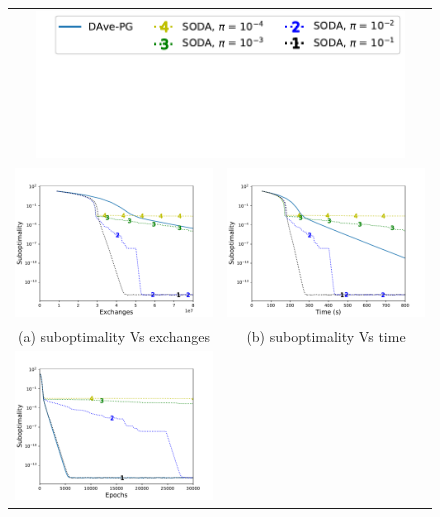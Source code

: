 \begin{figure}
\begin{tabular}{cc}
\multicolumn{2}{c}{\vspace{-4pt}\includegraphics[width = 0.9\textwidth]{SODA/Figs/legend.pdf}}\vspace*{-100pt}\\
\includegraphics[width = 0.49\linewidth]{SODA/Figs/rcv_20w_00005_0001_fun_vs_ex_log.pdf}& %
\includegraphics[width = 0.49\linewidth]{SODA/Figs/rcv_20w_00005_0001_fun_vs_time_log.pdf}\\%
(a) suboptimality Vs exchanges  & (b) suboptimality Vs time\\
\includegraphics[width = 0.49\linewidth]{SODA/Figs/rcv_20w_00005_0001_fun_vs_ite_log.pdf} & %

\end{tabular}
\end{figure}
